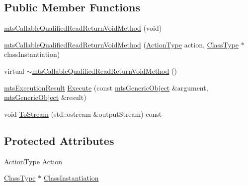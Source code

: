 \subsection*{Public Member Functions}
\begin{DoxyCompactItemize}
\item 
\hyperlink{classmts_callable_qualified_read_return_void_method_a82517eb2351f0065434298d074d6c73e}{mts\-Callable\-Qualified\-Read\-Return\-Void\-Method} (void)
\item 
\hyperlink{classmts_callable_qualified_read_return_void_method_a1d137b2c220e73ca6c1efc1f4842129b}{mts\-Callable\-Qualified\-Read\-Return\-Void\-Method} (\hyperlink{classmts_callable_qualified_read_return_void_method_a7ac7450d5dce9ad80db720a370118211}{Action\-Type} action, \hyperlink{classmts_callable_qualified_read_return_void_method_ae99cfab8208eb374f2cdf01c97edfa3b}{Class\-Type} $\ast$class\-Instantiation)
\item 
virtual \hyperlink{classmts_callable_qualified_read_return_void_method_a7a3d67f45cd55cdba171853ae6484c4f}{$\sim$mts\-Callable\-Qualified\-Read\-Return\-Void\-Method} ()
\item 
\hyperlink{classmts_execution_result}{mts\-Execution\-Result} \hyperlink{classmts_callable_qualified_read_return_void_method_ac347ad8cf790fb4094f9ac9c1d4cc70a}{Execute} (const \hyperlink{classmts_generic_object}{mts\-Generic\-Object} \&argument, \hyperlink{classmts_generic_object}{mts\-Generic\-Object} \&result)
\item 
void \hyperlink{classmts_callable_qualified_read_return_void_method_a269843820d9e3ae43bcdd51b0c5c6190}{To\-Stream} (std\-::ostream \&output\-Stream) const 
\end{DoxyCompactItemize}
\subsection*{Protected Attributes}
\begin{DoxyCompactItemize}
\item 
\hyperlink{classmts_callable_qualified_read_return_void_method_a7ac7450d5dce9ad80db720a370118211}{Action\-Type} \hyperlink{classmts_callable_qualified_read_return_void_method_ac7d58d66c42aa3c1071a121762b2d7fb}{Action}
\item 
\hyperlink{classmts_callable_qualified_read_return_void_method_ae99cfab8208eb374f2cdf01c97edfa3b}{Class\-Type} $\ast$ \hyperlink{classmts_callable_qualified_read_return_void_method_ace93cdd3d5c06f66479ab1e1cd29ece3}{Class\-Instantiation}
\end{DoxyCompactItemize}


